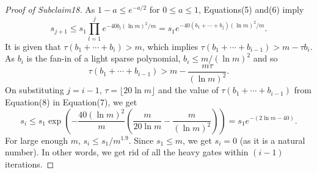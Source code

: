 \begin{proof}[Proof of Subclaim18]
As $1-a\le e^{-a/2}$ for $0\le a\le1$, Equations(5) and(6) imply
\begin{equation}
s_{j+1}\le s_1\prod_{l=1}^je^{-40b_l(\ln m)^2/m}
=s_1e^{-40(b_1+\cdots+b_j)(\ln m)^2/m}.\tag{7}
\end{equation}
It is given that $\tau(b_1+\cdots+b_i)>m$, which implies $\tau(b_1+\cdots+b_{i-1})>m-\tau b_i$. As $b_i$ is the fan-in of a light sparse polynomial, $b_i\le m/(\ln m)^2$ and so
\begin{equation}
\tau(b_1+\cdots+b_{i-1})>m-\frac{m\tau}{(\ln m)^2}.\tag{8}
\end{equation}
On substituting $j=i-1$, $\tau=\lfloor20\ln m\rfloor$ and the value of $\tau(b_1+\cdots+b_{i-1})$ from Equation(8) in Equation(7), we get
\[
s_i\le s_1\exp\left(-\frac{40(\ln m)^2}{m}
\left(\frac m{20\ln m}-\frac m{(\ln m)^2}\right)\right)
=s_1e^{-(2\ln m-40)}.
\]
For large enough $m$, $s_i\le s_1/m^{1.9}$. Since $s_1\le m$, we get $s_i=0$ (as it is a natural number). In other words, we get rid of all the heavy gates within $(i-1)$ iterations.
\end{proof}
